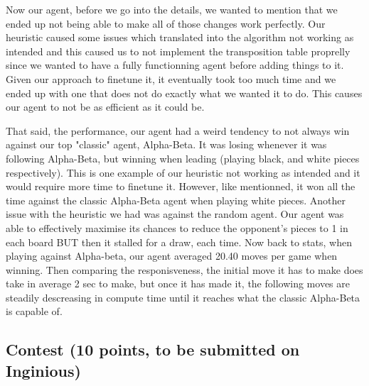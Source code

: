 \documentclass[11pt,a4paper]{report}
\begin{document}
\begin{answers}[23cm]
    Now our agent, before we go into the details, we wanted to mention that we ended up not being able to make all of those changes work perfectly. 
    Our heuristic caused some issues which translated into the algorithm not working as intended and this caused us to not implement the transposition 
    table proprelly since we wanted to have a fully functionning agent before adding things to it. Given our approach to finetune it, it eventually took 
    too much time and we ended up with one that does not do exactly what we wanted it to do. This causes our agent to not be as efficient as it could be.

    That said, the performance, our agent had a weird tendency to not always win against our top "classic" agent, Alpha-Beta. It was losing whenever it 
    was following Alpha-Beta, but winning when leading (playing black, and white pieces respectively). This is one example of our heuristic not working 
    as intended and it would require more time to finetune it. However, like mentionned, it won all the time against the classic Alpha-Beta agent when playing
    white pieces. Another issue with the heuristic we had was against the random agent. Our agent was able to effectively maximise its chances to reduce 
    the opponent's pieces to 1 in each board BUT then it stalled for a draw, each time.  
    Now back to stats, when playing against Alpha-beta, our agent averaged 20.40 moves per game when winning. Then comparing the responisveness, 
    the initial move it has to make does take in average 2 sec to make, but once it has made it, the following moves are steadily descreasing in compute time
    until it reaches what the classic Alpha-Beta is capable of.
    
\end{answers}


\subsection{Contest (10 points, to be submitted on Inginious)}
\end{document}
